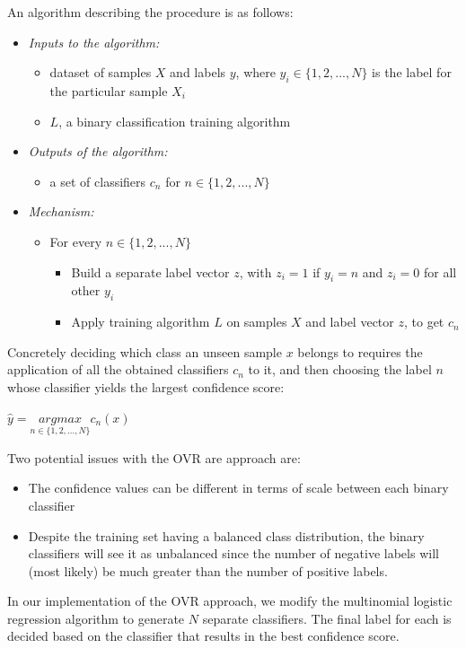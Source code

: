 \documentclass[journal]{IEEEtran}
\begin{document}
An algorithm describing the procedure is as follows:
\begin{itemize}
\item\textit{Inputs to the algorithm:}
\begin{itemize}
\item dataset of samples $X$ and labels $y$, where $y_{i} \in \{1, 2, ..., N\}$ is the label for the particular sample $X_{i}$
\item $L$, a binary classification training algorithm 
\end{itemize}
\item\textit{Outputs of the algorithm:}
\begin{itemize}
\item a set of classifiers $c_{n}$ for $n \in \{1, 2, ..., N\}$
\end{itemize}
\item\textit{Mechanism:}
\begin{itemize}
\item For every $n \in \{1, 2, ..., N\}$
	\begin{itemize}
	\item Build a separate label vector $z$, with $z_{i} = 1$ if $y_{i} = n$ and $z_{i} = 0$ for all other $y_{i}$
	\item Apply training algorithm $L$ on samples $X$ and label vector $z$, to get $c_{n}$ 
	\end{itemize}
\end{itemize}
\end{itemize}\par
Concretely deciding which class an unseen sample $x$ belongs to requires the application of all the obtained classifiers $c_{n}$ to it, and then choosing the label $n$ whose classifier yields the largest confidence score:
\begin{center}
${\hat{y}} =\underset{n\in\{1, 2, ..., N\}}{argmax} c_{n}(x)$
\end{center} \par
Two potential issues with the OVR are approach are:
\begin{itemize}
\item The confidence values can be different in terms of scale between each binary classifier
\item Despite the training set having a balanced class distribution, the binary classifiers will see it as unbalanced since the number of negative labels will (most likely) be much greater than the number of positive labels.
\end{itemize}
In our implementation of the OVR approach, we modify the multinomial logistic regression algorithm to generate $N$ separate classifiers. The final label for each is decided based on the classifier that results in the best confidence score.
\end{document}
